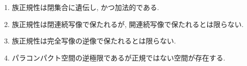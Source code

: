 \documentclass[uplatex, dvipdfmx, a4paper, 12pt, class=jsarticle, crop=false]{standalone}
\begin{document}
\begin{problem}[5.1.C]\label{eng-5-1-C-problem}
    \begin{enumerate}
        \item 族正規性は閉集合に遺伝し, かつ加法的である.
        \item 族正規性は閉連続写像で保たれるが, 開連続写像で保たれるとは限らない.
        \item 族正規性は完全写像の逆像で保たれるとは限らない.
        \item パラコンパクト\Hausdorff 空間の逆極限であるが正規ではない空間が存在する.
    \end{enumerate}
\end{problem}
\end{document}
